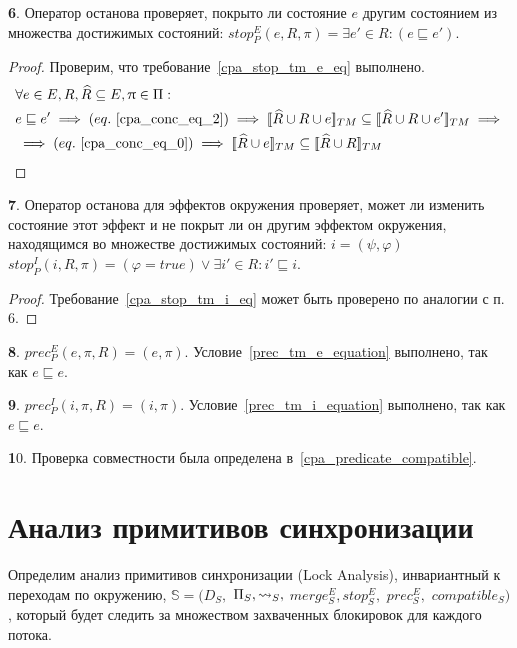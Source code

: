 {\textbf 6.} Оператор останова проверяет, покрыто ли состояние $e$ другим состоянием из множества достижимых состояний: $stop^E_{P}(e, R, \pi) = \exists e'\in R: (e \sqsubseteq e')$.

\begin{proof}
Проверим, что требование~\ref{cpa_stop_tm_e_eq} выполнено.
\begin{align}
&\forall e \in E, R, \widehat{R} \subseteq E, \pi \in \Pi: \nonumber \\
& e \sqsubseteq e' \implies (eq.~\ref{cpa_conc_eq_2}) \implies \conctm{\widehat{R} \cup R \cup e} \subseteq \conctm{\widehat{R} \cup R \cup e'} \implies \nonumber \\
& \implies (eq.~\ref{cpa_conc_eq_0}) \implies \conctm{\widehat{R} \cup e} \subseteq \conctm{\widehat{R} \cup R} \nonumber
\end{align}
\end{proof}

{\textbf 7.} Оператор останова для эффектов окружения проверяет, может ли изменить состояние этот эффект и не покрыт ли он другим эффектом окружения, находящимся во множестве достижимых состояний:  $i=(\psi,\varphi)$
$stop^I_{P}(i, R, \pi) = (\varphi=true) \lor \exists i'\in R: i' \sqsubseteq i$.

\begin{proof}
Требование~\ref{cpa_stop_tm_i_eq} может быть проверено по аналогии с п. 6. 
\end{proof}

{\textbf 8.} $prec^E_{P}(e, \pi, R) = (e, \pi)$. Условие~\ref{prec_tm_e_equation} выполнено, так как $e \sqsubseteq e$.

{\textbf 9.} $prec^I_{P}(i, \pi, R) = (i, \pi)$. Условие~\ref{prec_tm_i_equation} выполнено, так как $e \sqsubseteq e$.

{\textbf 10.} Проверка совместности была определена в~\ref{cpa_predicate_compatible}.

\section{Анализ примитивов синхронизации}
\label{sect_lock_analysis}

\newcommand{\bots}{\bot_\mathcal{S}}
\newcommand{\tops}{\top_\mathcal{S}}

Определим анализ примитивов синхронизации (Lock Analysis), инвариантный к переходам по окружению, $\mathbb{S}=(D_{S},$ $\Pi_{S}, \leadsto_{S},$ $merge^E_{S}, stop^E_{S},$ $prec^E_{S},$ $compatible_{S})$, который будет следить за множеством захваченных блокировок для каждого потока.

